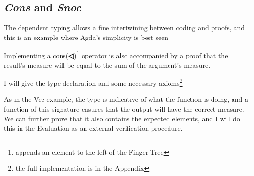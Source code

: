 \documentclass[12pt,twoside,notitlepage]{report}
\newcommand{\Conid}[1]{\mathit{#1}}
\newcommand{\Varid}[1]{\mathit{#1}}
\newcommand{\anonymous}{\kern0.06em \_}
\def\resethooks{%
  \global\let\SaveRestoreHook\empty
  \global\let\ColumnHook\empty}
\newcommand{\hsindent}[1]{\quad}%
\let\hspre\empty
\let\hspost\empty
\begin{document}
\subsection{\textit{Cons} and \textit{Snoc}}

The dependent typing allows a fine intertwining between coding and proofs, and this is an example where Agda's simplicity is best seen.

 
Implementing a cons(\textbf{◁})\footnote{appends an element to the left of the Finger Tree} operator is also accompanied by a proof that the result's measure will be equal to the sum of the argument's measure.

I will give the type declaration and some necessary axioms\footnote{the full implementation is in the Appendix}

\resethooks

As in the Vec example, the type is indicative of what the function is doing, and a function of this signature
ensures that the output will have the correct measure. We can further prove that it also contains the expected elements, and I will do this in the Evaluation as an external verification procedure.
\end{document}
